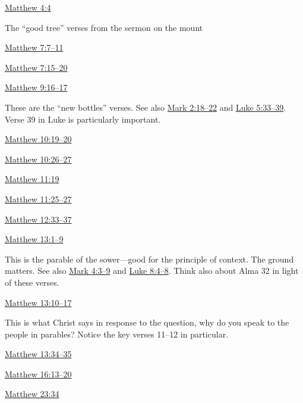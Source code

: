 			\begin{compactdesc}
				\item[{\hyperref[MATTHEW-4-4]{Matthew 4:4}}]
				\item The ``good tree'' verses from the sermon on the mount
				\item[{\hyperref[MATTHEW-7-11]{Matthew 7:7--11}}]
				\item[{\hyperref[MATTHEW-7-15]{Matthew 7:15--20}}]
				\item[{\hyperref[MATTHEW-9-16]{Matthew 9:16--17}}] \phantom{.}
					\begin{compactitem}
						\item These are the ``new bottles'' verses. See also \hyperref[MARK-2-18]{Mark 2:18--22} and \hyperref[LUKE-5-33]{Luke 5:33--39}. Verse 39 in Luke is particularly important. 
					\end{compactitem}
				\item[{\hyperref[MATTHEW-10-19]{Matthew 10:19--20}}]
				\item[{\hyperref[MATTHEW-10-26]{Matthew 10:26--27}}]
				\item[{\hyperref[MATTHEW-11-19]{Matthew 11:19}}]
				\item[{\hyperref[MATTHEW-11-25]{Matthew 11:25--27}}]
				\item[{\hyperref[MATTHEW-12-33]{Matthew 12:33--37}}]
				\item[{\hyperref[MATTHEW-13-1]{Matthew 13:1--9}}] \phantom{.}
					\begin{compactitem}
						\item This is the parable of the sower---good for the principle of context. The ground matters. See also \hyperref[MARK-4-3]{Mark 4:3--9} and \hyperref[LUKE-8-4]{Luke 8:4--8}. Think also about Alma 32 in light of these verses.
					\end{compactitem}
				\item[{\hyperref[MATTHEW-13-10]{Matthew 13:10--17}}] \phantom{.}
					\begin{compactitem}
						\item This is what Christ says in response to the question, why do you speak to the people in parables? Notice the key verses 11--12 in particular.
					\end{compactitem}
				\item[{\hyperref[MATTHEW-13-34]{Matthew 13:34--35}}] 
				\item[{\hyperref[MATTHEW-16-13]{Matthew 16:13--20}}] 
				\item[{\hyperref[MATTHEW-23-34]{Matthew 23:34}}] \phantom{.}

\end{compactdesc}
